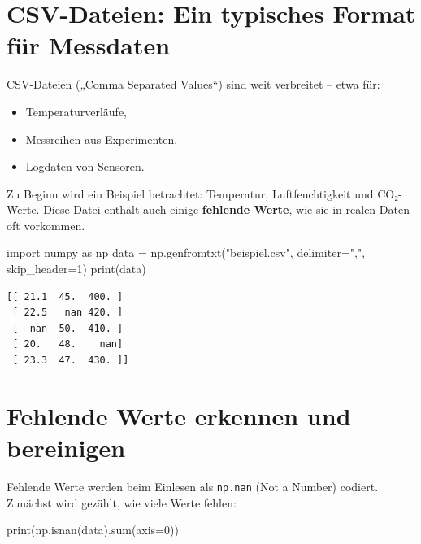 \documentclass[
  letterpaper,
  DIV=11,
  numbers=noendperiod]{scrreprt}
\newenvironment{Shaded}{\begin{snugshade}}{\end{snugshade}}
\newcommand{\BuiltInTok}[1]{\textcolor[rgb]{0.00,0.23,0.31}{#1}}
\newcommand{\DecValTok}[1]{\textcolor[rgb]{0.68,0.00,0.00}{#1}}
\newcommand{\ImportTok}[1]{\textcolor[rgb]{0.00,0.46,0.62}{#1}}
\newcommand{\NormalTok}[1]{\textcolor[rgb]{0.00,0.23,0.31}{#1}}
\newcommand{\OperatorTok}[1]{\textcolor[rgb]{0.37,0.37,0.37}{#1}}
\newcommand{\StringTok}[1]{\textcolor[rgb]{0.13,0.47,0.30}{#1}}
\providecommand{\tightlist}{%
  \setlength{\itemsep}{0pt}\setlength{\parskip}{0pt}}\usepackage{longtable,booktabs,array}
\begin{document}
\section{CSV-Dateien: Ein typisches Format für
Messdaten}\label{csv-dateien-ein-typisches-format-fuxfcr-messdaten}

CSV-Dateien („Comma Separated Values``) sind weit verbreitet -- etwa
für:

\begin{itemize}
\tightlist
\item
  Temperaturverläufe,
\item
  Messreihen aus Experimenten,
\item
  Logdaten von Sensoren.
\end{itemize}

Zu Beginn wird ein Beispiel betrachtet: Temperatur, Luftfeuchtigkeit und
CO₂-Werte. Diese Datei enthält auch einige \textbf{fehlende Werte}, wie
sie in realen Daten oft vorkommen.

\begin{Shaded}
\begin{Highlighting}[]
\ImportTok{import}\NormalTok{ numpy }\ImportTok{as}\NormalTok{ np}
\NormalTok{data }\OperatorTok{=}\NormalTok{ np.genfromtxt(}\StringTok{"beispiel.csv"}\NormalTok{, delimiter}\OperatorTok{=}\StringTok{","}\NormalTok{, skip\_header}\OperatorTok{=}\DecValTok{1}\NormalTok{)}
\BuiltInTok{print}\NormalTok{(data)}
\end{Highlighting}
\end{Shaded}

\begin{verbatim}
[[ 21.1  45.  400. ]
 [ 22.5   nan 420. ]
 [  nan  50.  410. ]
 [ 20.   48.    nan]
 [ 23.3  47.  430. ]]
\end{verbatim}

\section{Fehlende Werte erkennen und
bereinigen}\label{fehlende-werte-erkennen-und-bereinigen}

Fehlende Werte werden beim Einlesen als \texttt{np.nan} (Not a Number)
codiert. Zunächst wird gezählt, wie viele Werte fehlen:

\begin{Shaded}
\begin{Highlighting}[]
\BuiltInTok{print}\NormalTok{(np.isnan(data).}\BuiltInTok{sum}\NormalTok{(axis}\OperatorTok{=}\DecValTok{0}\NormalTok{))}
\end{Highlighting}
\end{Shaded}
\end{document}
